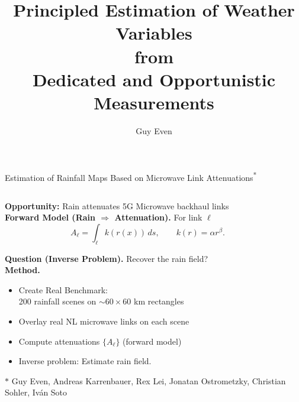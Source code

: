\documentclass[aspectratio=169]{beamer}
\title{
{\texorpdfstring{\centering Principled Estimation of Weather Variables\\ from\\ Dedicated and Opportunistic Measurements}{Principled Estimation of Weather Variables from Dedicated and Opportunistic Measurements}}}
\author{Guy Even}
\institute{MPI-INF}
\begin{document}

\begin{frame}{Estimation of Rainfall Maps Based on Microwave Link Attenuations\textsuperscript{*}}

  \footnotesize

  \setlength{\parskip}{0pt}
  \setlength{\itemsep}{0.15em}
  \setlength{\topsep}{0.2em}
  \setlength{\partopsep}{0pt}
  \setlength{\parsep}{0pt}

  \begin{columns}[T,onlytextwidth]

    \begin{column}{0.62\textwidth}

      \textbf{Opportunity:} Rain attenuates 5G Microwave backhaul links
      \\
      \vspace{0.25em}
      \textbf{Forward Model (Rain $\Rightarrow$ Attenuation).}
      For link $\ell$
      \[
        A_\ell = \int_{\ell} k(r(x))\,ds,
        \qquad k(r)=\alpha r^\beta.
      \]

      \vspace{0.25em}
      \textbf{Question (Inverse Problem).}
      Recover the rain field?
      \\
      \vspace{0.35em}
      \textbf{Method.}
      \begin{itemize}
        \item Create Real Benchmark: \\200 rainfall scenes on $\sim 60\times 60$ km rectangles
        \item Overlay real NL microwave links on each scene
        \item Compute attenuations $\{A_\ell\}$ (forward model)
        \item Inverse problem: Estimate rain field.
      \end{itemize}

      $*$ Guy Even,
      Andreas Karrenbauer,
      Rex Lei,
      Jonatan Ostrometzky,
      Christian Sohler,
      Iván Soto
    \end{column}

    \begin{column}{0.38\textwidth}


\end{column}
\end{columns}
\end{frame}
\end{document}
